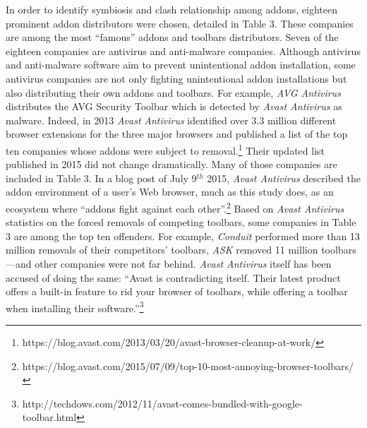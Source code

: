 \documentclass{article} %
\begin{document}
In order to identify symbiosis and clash relationship among addons, eighteen prominent addon distributors were chosen, detailed in Table 3. These companies are among the most ``famous'' addons and toolbars distributors. Seven of the eighteen companies are antivirus and anti-malware companies. Although antivirus and anti-malware software aim to prevent unintentional addon installation, some antivirus companies are not only fighting unintentional addon installations but also distributing their own addons and toolbars. For example, \textit{AVG Antivirus} distributes the AVG Security Toolbar which is detected by \textit{Avast Antivirus} as malware. Indeed, in 2013 \textit{Avast} \textit{Antivirus} identified over 3.3 million different browser extensions for the three major browsers and published a list of the top ten companies whose addons were subject to removal.\footnote{ https://blog.avast.com/2013/03/20/avast-browser-cleanup-at-work/} Their updated list published in 2015 did not change dramatically. Many of those companies are included in Table 3. In a blog post of July 9${}^{th}$ 2015, \textit{Avast Antivirus} described the addon environment of a user's Web browser, much as this study does, as an ecosystem where ``addons fight against each other''.\footnote{ https://blog.avast.com/2015/07/09/top-10-most-annoying-browser-toolbars/} Based on \textit{Avast Antivirus} statistics on the forced removals of competing toolbars, some companies in Table 3 are among the top ten offenders. For example, \textit{Conduit} performed more than 13 million removals of their competitors' toolbars, \textit{ASK }removed 11 million toolbars---and other companies were not far behind. \textit{Avast Antivirus} itself has been accused of doing the same: ``Avast is contradicting itself. Their latest product offers a built-in feature to rid your browser of toolbars, while offering a toolbar when installing their software.''\footnote{ http://techdows.com/2012/11/avast-comes-bundled-with-google-toolbar.html}

\noindent  
\end{document}
